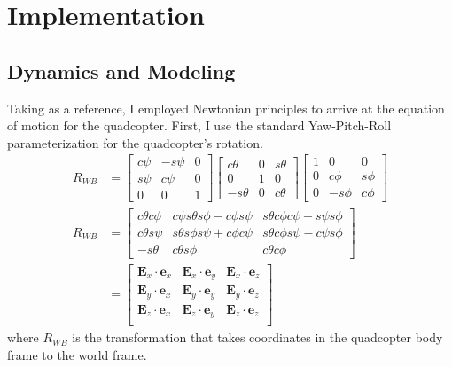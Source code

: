 \documentclass[conference]{IEEEtran}
\newcommand{\cphi}{c\phi}
\newcommand{\cth}{c\theta}
\newcommand{\cpsi}{c\psi}
\newcommand{\sphi}{s\phi}
\newcommand{\sth}{s\theta}
\newcommand{\spsi}{s\psi}
\newcommand{\E}{\mathbf{E}}
\newcommand{\e}{\mathbf{e}}
\begin{document}
\section{Implementation} \label{implementation}
\subsection{Dynamics and Modeling}
Taking \cite{bib:model} as a reference, I employed Newtonian principles to arrive at the equation of motion for the quadcopter. First, I use the standard Yaw-Pitch-Roll parameterization for the quadcopter's rotation.
\begin{align*}
R_{WB} &= \begin{bmatrix}
 \cpsi & -\spsi   & 0\\ 
 \spsi & \cpsi  & 0\\ 
 0 & 0 & 1
\end{bmatrix}
\begin{bmatrix}
 \cth & 0   & \sth\\ 
 0 & 1  & 0\\ 
 -\sth & 0 & \cth
\end{bmatrix}
\begin{bmatrix}
 1 & 0   & 0\\ 
0 & \cphi  & \sphi\\ 
 0 & -\sphi & \cphi
\end{bmatrix} \\
R_{WB} &= 
\begin{bmatrix}
 \cth\cphi & \cpsi\sth\sphi - \cphi\spsi   & \sth\cphi\cpsi + \spsi\sphi\\ 
\cth\spsi & \sth\sphi\spsi + \cphi\cpsi  & \sth\cphi\spsi - \cpsi\sphi\\ 
 -\sth & \cth\sphi & \cth\cphi 
\end{bmatrix} \\
&= 
\begin{bmatrix}
\E_x \cdot \e_x & \E_x \cdot \e_y   & \E_x \cdot \e_z \\ 
\E_y \cdot \e_x & \E_y \cdot \e_y   & \E_y \cdot \e_z \\ 
\E_z \cdot \e_x & \E_z \cdot \e_y   & \E_z \cdot \e_z \\ 
\end{bmatrix}
\end{align*}
where $R_{WB}$ is the transformation that takes coordinates in the quadcopter body frame to the world frame.
\end{document}
